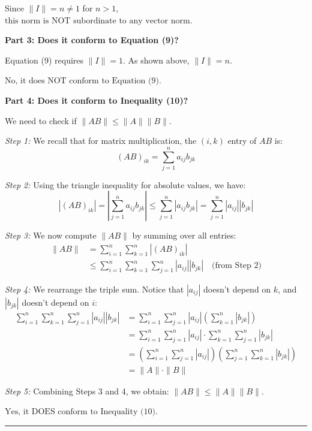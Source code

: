 Since $\|I\| = n \neq 1$ for $n > 1$, $\boxed{\text{this norm is NOT subordinate to any vector norm.}}$

\vspace{0.5em}

\textbf{Part 3: Does it conform to Equation (9)?}

Equation (9) requires $\|I\| = 1$. As shown above, $\|I\| = n$.

$\boxed{\text{No, it does NOT conform to Equation (9).}}$

\vspace{0.5em}

\textbf{Part 4: Does it conform to Inequality (10)?}

We need to check if $\|AB\| \leq \|A\| \|B\|$.

\textit{Step 1:} We recall that for matrix multiplication, the $(i,k)$ entry of $AB$ is:
$$(AB)_{ik} = \sum_{j=1}^{n} a_{ij}b_{jk}$$

\textit{Step 2:} Using the triangle inequality for absolute values, we have:
$$|(AB)_{ik}| = \left|\sum_{j=1}^{n} a_{ij}b_{jk}\right| \leq \sum_{j=1}^{n} |a_{ij}b_{jk}| = \sum_{j=1}^{n} |a_{ij}| |b_{jk}|$$

\textit{Step 3:} We now compute $\|AB\|$ by summing over all entries:
\begin{align*}
\|AB\| &= \sum_{i=1}^{n} \sum_{k=1}^{n} |(AB)_{ik}| \\
&\leq \sum_{i=1}^{n} \sum_{k=1}^{n} \sum_{j=1}^{n} |a_{ij}| |b_{jk}| \quad \text{(from Step 2)}
\end{align*}

\textit{Step 4:} We rearrange the triple sum. Notice that $|a_{ij}|$ doesn't depend on $k$, and $|b_{jk}|$ doesn't depend on $i$:
\begin{align*}
\sum_{i=1}^{n} \sum_{k=1}^{n} \sum_{j=1}^{n} |a_{ij}| |b_{jk}| &= \sum_{i=1}^{n} \sum_{j=1}^{n} |a_{ij}| \left(\sum_{k=1}^{n} |b_{jk}|\right) \\
&= \sum_{i=1}^{n} \sum_{j=1}^{n} |a_{ij}| \cdot \sum_{k=1}^{n} \sum_{j=1}^{n} |b_{jk}| \\
&= \left(\sum_{i=1}^{n} \sum_{j=1}^{n} |a_{ij}|\right) \left(\sum_{j=1}^{n} \sum_{k=1}^{n} |b_{jk}|\right) \\
&= \|A\| \cdot \|B\|
\end{align*}

\textit{Step 5:} Combining Steps 3 and 4, we obtain: $\|AB\| \leq \|A\| \|B\|$.

$\boxed{\text{Yes, it DOES conform to Inequality (10).}}$

\vspace{2em}
\noindent\rule{\textwidth}{0.4pt}
